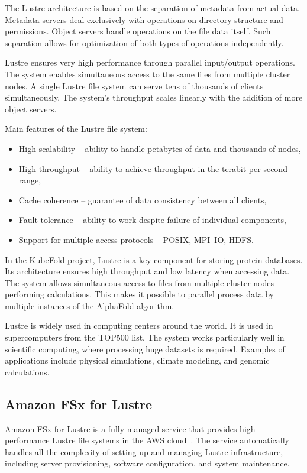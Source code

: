 The Lustre architecture is based on the separation of metadata from actual data.
Metadata servers deal exclusively with operations on directory structure and permissions.
Object servers handle operations on the file data itself.
Such separation allows for optimization of both types of operations independently.

Lustre ensures very high performance through parallel input/output operations.
The system enables simultaneous access to the same files from multiple cluster nodes.
A single Lustre file system can serve tens of thousands of clients simultaneously.
The system's throughput scales linearly with the addition of more object servers.

Main features of the Lustre file system:
\begin{itemize}
    \item High scalability -- ability to handle petabytes of data and thousands of nodes,
    \item High throughput -- ability to achieve throughput in the terabit per second range,
    \item Cache coherence -- guarantee of data consistency between all clients,
    \item Fault tolerance -- ability to work despite failure of individual components,
    \item Support for multiple access protocols -- POSIX, MPI--IO, HDFS\@.
\end{itemize}

In the KubeFold project, Lustre is a key component for storing protein databases.
Its architecture ensures high throughput and low latency when accessing data.
The system allows simultaneous access to files from multiple cluster nodes performing calculations.
This makes it possible to parallel process data by multiple instances of the AlphaFold algorithm.

Lustre is widely used in computing centers around the world.
It is used in supercomputers from the TOP500 list.
The system works particularly well in scientific computing, where processing huge datasets is required.
Examples of applications include physical simulations, climate modeling, and genomic calculations.

\subsection{Amazon FSx for Lustre}\label{subsec:amazon-fsx-for-lustre}

Amazon FSx for Lustre is a fully managed service that provides high--performance Lustre file systems in the AWS cloud~\cite{aws_fsx}.
The service automatically handles all the complexity of setting up and managing Lustre infrastructure, including server provisioning, software configuration, and system maintenance.

